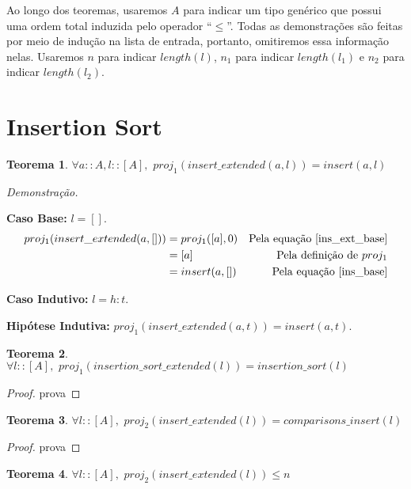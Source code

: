 \documentclass[12pt, oneside, a4paper,english,brazil]{abntex2}
\begin{document}
\qquad Ao longo dos teoremas, usaremos $A$ para indicar um tipo gen\'erico que possui uma ordem total induzida pelo operador ``$\le$''. Todas as demonstra\c{c}\~oes s\~ao feitas por meio de indu\c{c}\~ao na lista de entrada, portanto, omitiremos essa informa\c{c}\~ao nelas. Usaremos $n$ para indicar $length(l)$, $n_{1}$ para indicar $length(l_{1})$ e $n_{2}$ para indicar $length(l_{2})$.

\section{Insertion Sort}

\newtheorem{teorema}{Teorema}[section]

\begin{teorema}
  $\forall a :: A, l :: [A], \,\, proj_1(insert\_extended(a, l)) = insert(a, l)$
\end{teorema}
\noindent \textit{Demonstra\c{c}\~ao.}

  \textbf{Caso Base: } $l = []$.
  \begin{align*}
    proj_{1}(insert\_extended(a, [])) &= proj_{1}([a], 0)  &\text{Pela equa\c{c}\~ao \ref{ins_ext_base}} \\
                                      &= [a] &\text{Pela defini\c{c}\~ao de $proj_{1}$}\\
    &= insert(a, [])  &\text{Pela equa\c{c}\~ao \ref{ins_base}}
  \end{align*}

  \textbf{Caso Indutivo: } $l = h : t$.

  \textbf{Hip\'otese Indutiva: } $proj_{1}(insert\_extended(a, t)) = insert(a, t)$.



\begin{teorema}
  $\forall l :: [A], \,\, proj_{1}(insertion\_sort\_extended(l)) = insertion\_sort(l)$
\end{teorema}

\begin{proof}
  prova
\end{proof}


\begin{teorema}
  $\forall l :: [A], \,\, proj_{2}(insert\_extended(l)) = comparisons\_insert(l)$
\end{teorema}

\begin{proof}
  prova
\end{proof}

\begin{teorema}
  $\forall l :: [A], \,\, proj_{2}(insert\_extended(l)) \le n$
\end{teorema}
\end{document}
